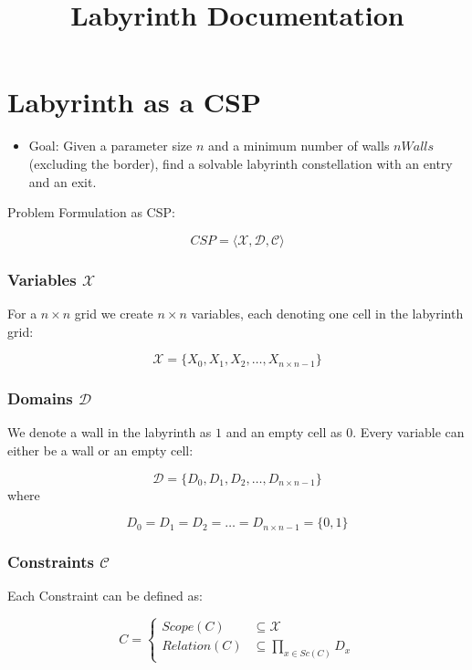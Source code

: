 \documentclass[11pt,a4paper]{article}
\title{Labyrinth Documentation}
\author{}
\date{}
\begin{document}
\maketitle



\section{Labyrinth as a CSP}

\begin{itemize}
\item Goal: Given a parameter size $n$ and a minimum number of walls $nWalls$ (excluding the border), find a solvable labyrinth constellation with an entry and an exit. 
\end{itemize}

Problem Formulation as CSP: 

\[
CSP = \langle \mathcal{X}, \mathcal{D}, \mathcal{C} \rangle
\]

\subsubsection{Variables $\mathcal{X}$}

For a $n \times n$ grid we create $n \times n$ variables, each denoting one cell in the labyrinth grid:

\[
\mathcal{X} = \{X_0, X_1, X_2, \ldots, X_{n \times n - 1}\}
\]

\subsubsection{Domains $\mathcal{D}$}

We denote a wall in the labyrinth as $1$ and an empty cell as $0$. Every variable can either be a wall or an empty cell:

\[
\mathcal{D} = \{D_0, D_1, D_2, \ldots, D_{n \times n - 1}\}
\]
where

\[
D_0 = D_1 = D_2 = \dots = D_{n \times n - 1} = \{0,1\}
\]

\subsubsection{Constraints $\mathcal{C}$}

Each Constraint can be defined as: 

\[
C =
\begin{cases}
Scope(C) & \subseteq \mathcal{X}  \\
Relation(C) & \subseteq \prod_{x \in Sc(C)}^{} D_x
\end{cases}
\]
\end{document}
